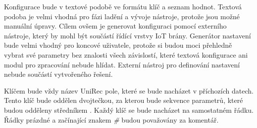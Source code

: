  Konfigurace bude v textové podobě ve formátu klíč a seznam hodnot. Textová podoba je velmi vhodná pro 
 fázi ladění a vývoje nástroje, protože jsou možné manuální úpravy. Cílem ovšem je generovat 
 konfiguraci pomocí externího nástroje, který by mohl být součástí řídící vrstvy IoT brány. Generátor
 nastavení bude velmi vhodný pro koncové uživatele, protože si budou moci přehledně vybrat své
 parametry bez znalosti všech závislostí, které textová konfigurace ani modul pro zpracování 
 nebude hlídat. Externí nástroj pro definování nastavení nebude součástí vytvořeného řešení.
 
 Klíčem bude vždy název UniRec pole, které se bude nacházet v příchozích datech. Tento klíč bude 
 oddělen dvojtečkou, za kterou bude sekvence parametrů, které budou odděleny středníkem . Každý klíč
 se bude nacházet na samostatném řádku. Řádky prázdné a začínající znakem \textit{\#} budou
 považovány za komentář. 
 

